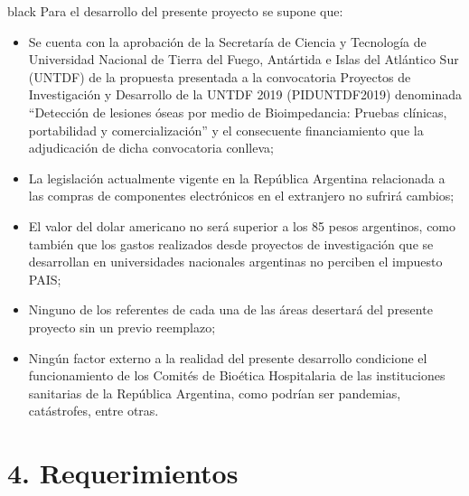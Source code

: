 \documentclass[11pt]{charter}
\begin{document}
\begin{consigna}{black}
Para el desarrollo del presente proyecto se supone que:

\begin{itemize}
\item Se cuenta con la aprobación de la Secretaría de Ciencia y Tecnología de Universidad Nacional de Tierra del Fuego, Antártida e Islas del Atlántico Sur (UNTDF) de la propuesta presentada a la convocatoria Proyectos de Investigación y Desarrollo de la UNTDF 2019 (PIDUNTDF2019) denominada ``Detección de lesiones óseas por medio de Bioimpedancia: Pruebas clínicas, portabilidad y comercialización'' y el consecuente financiamiento que la adjudicación de dicha convocatoria conlleva;
\item La legislación actualmente vigente en la República Argentina relacionada a las compras de componentes electrónicos en el extranjero no sufrirá cambios;
\item El valor del dolar americano no será superior a los 85 pesos argentinos, como también que los gastos realizados desde proyectos de investigación que se desarrollan en universidades nacionales argentinas no perciben el impuesto PAIS;
\item Ninguno de los referentes de cada una de las áreas desertará del presente proyecto sin un previo reemplazo;
\item Ningún factor externo a la realidad del presente desarrollo condicione el funcionamiento de los Comités de Bioética Hospitalaria de las instituciones sanitarias de la República Argentina, como podrían ser pandemias, catástrofes, entre otras.

\end{itemize}
\end{consigna}

\pagebreak

\section{4. Requerimientos}
\label{sec:requerimientos}
\end{document}
